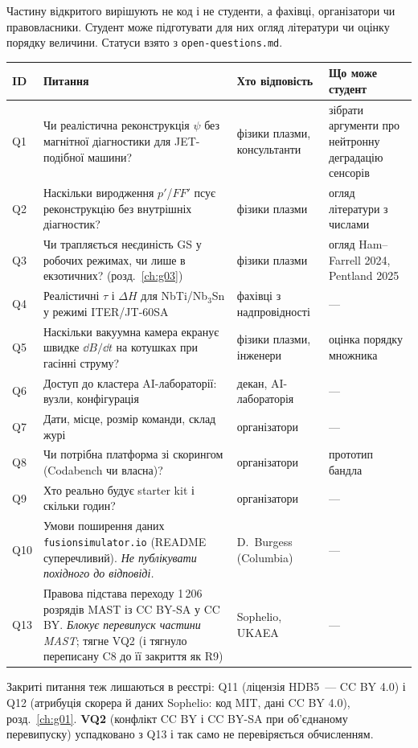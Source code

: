 Частину відкритого вирішують не код і не студенти, а фахівці, організатори чи правовласники.
Студент може підготувати для них огляд літератури чи оцінку порядку величини. Статуси взято з
\texttt{open-questions.md}.

{\small
\begin{longtable}{@{}>{\raggedright\arraybackslash}p{1.1cm}>{\raggedright\arraybackslash}p{7.6cm}>{\raggedright\arraybackslash}p{3.4cm}>{\raggedright\arraybackslash}p{3.4cm}@{}}
\toprule
\textbf{ID} & \textbf{Питання} & \textbf{Хто відповість} & \textbf{Що може студент}\\
\midrule
\endhead
Q1 & Чи реалістична реконструкція $\psi$ без магнітної діагностики для JET-подібної машини? & фізики плазми, консультанти & зібрати аргументи про нейтронну деградацію сенсорів\\
Q2 & Наскільки виродження $p'$/$FF'$ псує реконструкцію без внутрішніх діагностик? & фізики плазми & огляд літератури з числами\\
Q3 & Чи трапляється неєдиність GS у робочих режимах, чи лише в екзотичних? (розд.~\ref{ch:g03}) & фізики плазми & огляд Ham--Farrell 2024, Pentland 2025\\
Q4 & Реалістичні $\tau$ і $\Delta H$ для NbTi/Nb$_3$Sn у режимі ITER/JT-60SA & фахівці з надпровідності & ---\\
Q5 & Наскільки вакуумна камера екранує швидке $\dd B/\dd t$ на котушках при гасінні струму? & фізики плазми, інженери & оцінка порядку множника\\
Q6 & Доступ до кластера AI-лабораторії: вузли, конфігурація & декан, AI-лабораторія & ---\\
Q7 & Дати, місце, розмір команди, склад журі & організатори & ---\\
Q8 & Чи потрібна платформа зі скорингом (Codabench чи власна)? & організатори & прототип бандла\\
Q9 & Хто реально будує starter kit і скільки годин? & організатори & ---\\
Q10 & Умови поширення даних \texttt{fusionsimulator.io} (README суперечливий). \emph{Не публікувати похідного до відповіді.} & D.~Burgess (Columbia) & ---\\
Q13 & Правова підстава переходу 1\,206 розрядів MAST із CC BY-SA у CC BY. \emph{Блокує перевипуск частини MAST}; тягне VQ2 (і тягнуло переписану C8 до її закриття як R9) & Sophelio, UKAEA & ---\\
\bottomrule
\end{longtable}
}

Закриті питання теж лишаються в реєстрі: Q11 (ліцензія HDB5~--- CC BY 4.0) і Q12 (атрибуція
скорера й даних Sophelio: код MIT, дані CC BY 4.0), розд.~\ref{ch:g01}. \textbf{VQ2} (конфлікт
CC BY і CC BY-SA при об'єднаному перевипуску) успадковано з Q13 і так само не перевіряється
обчисленням.


